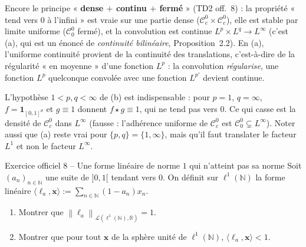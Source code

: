\documentclass[11pt,a4paper]{article}
\newcommand{\R}{\mathbb{R}}
\newcommand{\N}{\mathbb{N}}
\newcommand{\norm}[1]{\left\|#1\right\|}
\newcommand{\Lc}{\mathcal{L}}
\newcommand{\Cz}{\mathcal{C}^0}
\newcommand{\Cc}{\mathcal{C}^0_c}
\newcommand{\ie}{c'est-à-dire}
\theoremstyle{definition}
\begin{document}
\begin{pointcle}
Encore le principe « \textbf{dense $+$ continu $+$ fermé} » (TD2 off.~8) : la propriété « tend vers $0$ à l'infini » est vraie sur une partie dense ($\Cc\times\Cc$), elle est stable par limite uniforme ($\Cz_0$ fermé), et la convolution est continue $L^p\times L^q\to L^\infty$ (c'est (a), qui est un énoncé de \emph{continuité bilinéaire}, Proposition~2.2). En (a), l'uniforme continuité provient de la continuité des translations, \ie{} de la régularité « en moyenne » d'une fonction $L^p$ : la convolution \emph{régularise}, une fonction $L^p$ quelconque convolée avec une fonction $L^{p'}$ devient continue.
\end{pointcle}

\begin{piege}
L'hypothèse $1<p,q<\infty$ de (b) est indispensable : pour $p=1$, $q=\infty$, $f=\mathbf 1_{[0,1]^d}$ et $g\equiv1$ donnent $f\star g\equiv1$, qui ne tend pas vers $0$. Ce qui casse est la densité de $\Cc$ dans $L^\infty$ (fausse : l'adhérence uniforme de $\Cc$ est $\Cz_0\subsetneq L^\infty$). Noter aussi que (a) reste vrai pour $\{p,q\}=\{1,\infty\}$, mais qu'il faut translater le facteur $L^1$ et non le facteur $L^\infty$.
\end{piege}

\begin{exo}{Exercice officiel 8 -- Une forme linéaire de norme $1$ qui n'atteint pas sa norme}
Soit $(a_n)_{n\in\N}$ une suite de $]0,1[$ tendant vers $0$. On définit sur $\ell^1(\N)$ la forme linéaire $\langle\ell_a,\mathbf x\rangle:=\sum_{n\in\N}(1-a_n)x_n$.
\begin{enumerate}[label=\alph*)]
  \item Montrer que $\norm{\ell_a}_{\Lc(\ell^1(\N),\R)}=1$.
  \item Montrer que pour tout $\mathbf x$ de la sphère unité de $\ell^1(\N)$, $\langle\ell_a,\mathbf x\rangle<1$.
\end{enumerate}
\end{exo}
\end{document}
